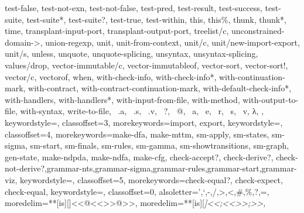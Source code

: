 {{test-false, test-not-exn, test-not-false, test-pred, test-result, test-success, test-suite, test-suite*, test-suite?, test-true, test-within, this, this\%, thunk, thunk*, time, transplant-input-port, transplant-output-port, treelist/c, unconstrained-domain->, union-regexp, unit, unit-from-context, unit/c, unit/new-import-export, unit/s, unless, unquote, unquote-splicing, unsyntax, unsyntax-splicing, values/drop, vector-immutable/c, vector-immutableof, vector-sort, vector-sort!, vector/c, vectorof, when, with-check-info, with-check-info*, with-continuation-mark, with-contract, with-contract-continuation-mark, with-default-check-info*, with-handlers, with-handlers*, with-input-from-file, with-method, with-output-to-file, with-syntax, write-to-file, ~.a, ~.s, ~.v, ~?, ~@, ~a, ~e, ~r, ~s, ~v, λ,
		},
		keywordstyle=\color{blue},
		classoffset=3,
		morekeywords={import, export},
		keywordstyle=\color{green},
		classoffset=4,
		morekeywords={make-dfa, make-mttm, sm-apply, sm-states, sm-sigma, sm-start, sm-finals, sm-rules, sm-gamma, sm-showtransitions, sm-graph, gen-state, make-ndpda, make-ndfa, make-cfg, check-accept?, check-derive?, check-not-derive?,grammar-nts,grammar-sigma,grammar-rules,grammar-start,grammar-viz},
		keywordstyle=\color{pakistangreen},
		classoffset=5,
		morekeywords={check-equal?, check-expect, check-equal},
		keywordstyle=\color{brown},
		classoffset=0,
		alsoletter={',`,-,/,>,<,\#,\%,?,=},
		moredelim=**[is][\color{lightgray}]{<<@<<}{>>@>>},
		moredelim=**[is][\itshape\color{OliveGreen}]{<<;<<}{>>;>>},
	}
